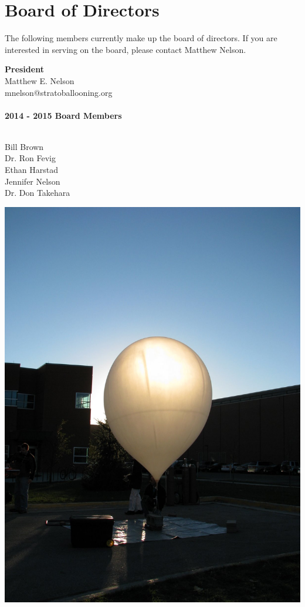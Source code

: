 \documentclass[10pt,foldmark,notumble]{leaflet}
\begin{document}
\section{Board of Directors}
The following members currently make up the board of directors.  If you are interested in serving on the board, please contact Matthew Nelson.
\begin{center}
{\bf President} \ \\
Matthew E. Nelson\ \\
mnelson@stratoballooning.org \ \\ \ \\

{\bf 2014 - 2015 Board Members}\ \\ \ \\
\begin{multicols}{2}
Bill Brown  \ \\ Dr. Ron Fevig \ \\ Ethan Harstad \ \\ Jennifer Nelson \ \\ Dr. Don Takehara
\end{multicols}

\includegraphics[scale=.23]{images/IMG_0826.jpg}

\end{center}
\end{document}
